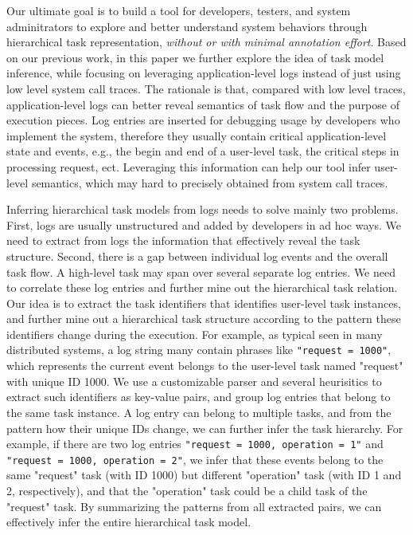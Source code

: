 Our ultimate goal is to build a tool for developers, 
testers, and system adminitrators to explore and better 
understand system behaviors through hierarchical task representation, 
\emph{without or with minimal annotation effort}.
Based on our previous work, in this paper
we further explore the idea of task model inference, 
while focusing on leveraging application-level logs instead of 
just using low level system call traces. 
The rationale is that, compared with low level traces, 
application-level logs can better reveal semantics of 
task flow and the purpose of execution pieces. 
Log entries are inserted for debugging usage 
by developers who implement the system, therefore they 
usually contain critical application-level state and events,
e.g., the begin and end of a user-level task, the critical 
steps in processing request, ect.
Leveraging this information can help our tool infer  
user-level semantics, which may hard to precisely obtained
from system call traces.

Inferring hierarchical task models from logs needs to 
solve mainly two problems. First, logs are usually unstructured
and added by developers in ad hoc ways. We need to extract
from logs the information that effectively reveal the task 
structure. Second, there is a gap between individual log events 
and the overall task flow. A high-level task may span over
several separate log entries. We need to correlate these
log entries and further mine out the hierarchical 
task relation. Our idea is to extract the task identifiers 
that identifies user-level task instances, and further
mine out a hierarchical task structure according to
the pattern these identifiers change during the execution.
For example, as typical seen in many distributed systems, 
a log string many contain phrases like 
\texttt{"request = 1000"}, which represents the current event
belongs to the user-level task named "request" with unique ID 1000. 
We use a customizable parser and several heurisitics
to extract such identifiers as key-value pairs,
and group log entries that belong to the same task instance.
A log entry can belong to multiple tasks, and from the 
pattern how their unique IDs change, we can further
infer the task hierarchy.
For example, if there are two log entries  
\texttt{"request = 1000, operation = 1"} and 
\texttt{"request = 1000, operation = 2"}, 
we infer that these events belong to the same "request" task
(with ID 1000) but different "operation" task (with ID 1 and 2,
respectively), and that the "operation" task could be 
a child task of the "request" task. 
By summarizing the patterns from all extracted pairs,
we can effectively infer the entire hierarchical task model. 


